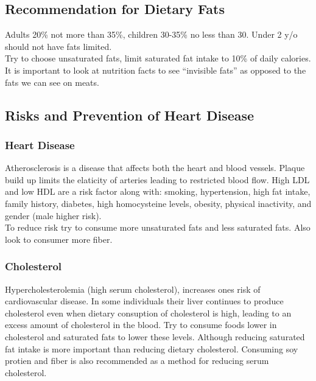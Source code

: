 \documentclass[letterpaper, 11pt]{article}
\begin{document}
\subsection{Recommendation for Dietary Fats}
\label{sec:orgf029c9f}
Adults 20\% not more than 35\%, children 30-35\% no less than 30. Under 2 y/o should not have fats limited.\\
Try to choose unsaturated fats, limit saturated fat intake to 10\% of daily calories.\\
It is important to look at nutrition facts to see ``invisible fats'' as opposed to the fats we can see on meats.\\
\subsection{Risks and Prevention of Heart Disease}
\label{sec:orgc6f2fff}
\subsubsection{Heart Disease}
\label{sec:org50e46db}
Atherosclerosis is a disease that affects both the heart and blood vessels. Plaque build up limits the elaticity of arteries leading to restricted blood flow. High LDL and low HDL are a risk factor along with: smoking, hypertension, high fat intake, family history, diabetes, high homocysteine levels, obesity, physical inactivity, and gender (male higher risk).\\
To reduce risk try to consume more unsaturated fats and less saturated fats. Also look to consumer more fiber.\\
\subsubsection{Cholesterol}
\label{sec:orgda50017}
Hypercholesterolemia (high serum cholesterol), increases ones risk of cardiovascular disease. In some individuals their liver continues to produce cholesterol even when dietary consuption of cholesterol is high, leading to an excess amount of cholesterol in the blood. Try to consume foods lower in cholesterol and saturated fats to lower these levels. Although reducing saturated fat intake is more important than reducing dietary cholesterol. Consuming soy protien and fiber is also recommended as a method for reducing serum cholesterol.\\
\end{document}

